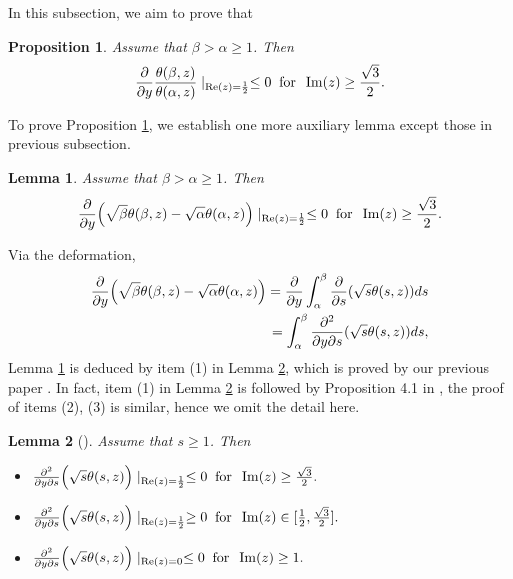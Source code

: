 \documentclass[reqno,english]{amsart}
\newtheorem{lemma}{Lemma}[section]
\newtheorem{proposition}{Proposition}[section]
\newtheorem{open problem}{Open Problem}[section]
\newtheorem{open question}{Open Question}[section]
\newtheorem{open questions on hexagonal lattice}{Open Questions on hexagonal lattice}[section]
\renewcommand{\Re}{\operatorname{Re}}
\renewcommand{\Im}{\operatorname{Im}}
\begin{document}
In this subsection, we aim to prove that
\begin{proposition}\label{Prop1B} Assume that $\beta>\alpha\geq1$. Then
\begin{equation}\aligned\nonumber
\frac{\partial}{\partial y}\frac{\theta(\beta,z)}{\theta(\alpha,z)}\mid_{\Re(z)=\frac{1}{2}}\leq0\;\;\hbox{for}\;\;\Im(z)\geq\frac{\sqrt3}{2}.
\endaligned\end{equation}

\end{proposition}
To prove Proposition \ref{Prop1B}, we establish one more auxiliary lemma except those in previous subsection.
\begin{lemma}\label{Lemma216} Assume that $\beta>\alpha\geq1$. Then
\begin{equation}\aligned\nonumber
\frac{\partial}{\partial y}\Big(\sqrt{\beta}\theta(\beta,z)-\sqrt{\alpha}\theta(\alpha,z)\Big)\mid_{\Re(z)=\frac{1}{2}}\leq0\;\;\hbox{for}\;\;\Im(z)\geq\frac{\sqrt3}{2}.
\endaligned\end{equation}

\end{lemma}
Via the deformation,
\begin{equation}\aligned\nonumber
\frac{\partial}{\partial y}\Big(\sqrt{\beta}\theta(\beta,z)-\sqrt{\alpha}\theta(\alpha,z)\Big)
=\frac{\partial}{\partial y}\int_\alpha^\beta \frac{\partial}{\partial s}(\sqrt{s}\theta(s,z))ds\\
=\int_\alpha^\beta \frac{\partial^2}{\partial y\partial s}(\sqrt{s}\theta(s,z))ds,
\endaligned\end{equation}
Lemma \ref{Lemma216} is deduced by item (1) in Lemma \ref{LemmaPPP}, which is proved by our previous paper \cite{Luo2023a}. In fact,
item (1) in Lemma \ref{LemmaPPP} is followed by Proposition 4.1 in \cite{Luo2023a}, the proof of items (2), (3) is similar, hence we omit the detail here.
\begin{lemma}[\cite{Luo2023a}]\label{LemmaPPP} Assume that $s\geq1$. Then
\begin{itemize}
  \item [(1)] $
\frac{\partial^2}{\partial y\partial s}\Big(\sqrt{s}\theta(s,z)\Big)\mid_{\Re(z)=\frac{1}{2}}\leq0\;\;\hbox{for}\;\;\Im(z)\geq\frac{\sqrt3}{2}.
$
  \item [(2)] $
\frac{\partial^2}{\partial y\partial s}\Big(\sqrt{s}\theta(s,z)\Big)\mid_{\Re(z)=\frac{1}{2}}\geq0\;\;\hbox{for}\;\;\Im(z)\in[\frac{1}{2},\frac{\sqrt3}{2}].
$

  \item [(3)] $
\frac{\partial^2}{\partial y\partial s}\Big(\sqrt{s}\theta(s,z)\Big)\mid_{\Re(z)=0}\leq0\;\;\hbox{for}\;\;\Im(z)\geq1.
$
\end{itemize}



\end{lemma}
\end{document}

